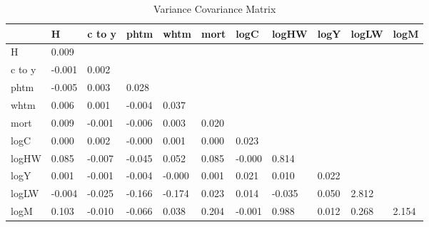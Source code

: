 \begin{table}[htbp]
\caption{\label{clabel} Variance Covariance Matrix}\centering\medskip
\begin{tabular}{lllllllllll} \hline \hline
 & H  & c to y  & phtm  & whtm  & mort  & logC  & logHW  & logY  & logLW  & logM  \\  \hline 
H &     0.009 \\  
c to y &    -0.001 &     0.002 \\  
phtm &    -0.005 &     0.003 &     0.028 \\  
whtm &     0.006 &     0.001 &    -0.004 &     0.037 \\  
mort &     0.009 &    -0.001 &    -0.006 &     0.003 &     0.020 \\  
logC &     0.000 &     0.002 &    -0.000 &     0.001 &     0.000 &     0.023 \\  
logHW &     0.085 &    -0.007 &    -0.045 &     0.052 &     0.085 &    -0.000 &     0.814 \\  
logY &     0.001 &    -0.001 &    -0.004 &    -0.000 &     0.001 &     0.021 &     0.010 &     0.022 \\  
logLW &    -0.004 &    -0.025 &    -0.166 &    -0.174 &     0.023 &     0.014 &    -0.035 &     0.050 &     2.812 \\  
logM &     0.103 &    -0.010 &    -0.066 &     0.038 &     0.204 &    -0.001 &     0.988 &     0.012 &     0.268 &     2.154 \\  
\hline \hline \end{tabular}
\end{table}
